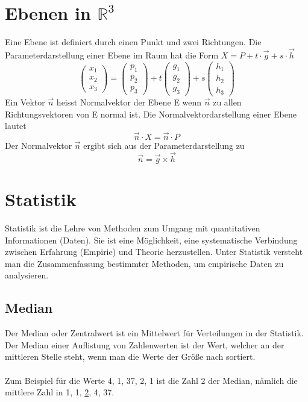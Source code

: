 \documentclass[a4paper]{article}
\begin{document}
\section{Ebenen in $\mathbb{R}^3$}
Eine Ebene ist definiert durch einen Punkt und zwei Richtungen.
Die Parameterdarstellung einer Ebene im Raum hat die Form $X=P+t\cdot \vec g + s \cdot \vec h$
\[\begin{pmatrix} x_1 \\ x_2\\ x_3 \end{pmatrix}=\begin{pmatrix} p_1 \\ p_2\\ p_3 \end{pmatrix} + t\begin{pmatrix} g_1 \\ g_2\\ g_3\end{pmatrix} + s\begin{pmatrix} h_1 \\ h_2\\ h_3\end{pmatrix} \]
Ein Vektor $\vec n$ heisst Normalvektor der Ebene E wenn $\vec n$ zu allen Richtungsvektoren von E normal ist. Die Normalvektordarstellung einer Ebene lautet
\[ \vec n \cdot X = \vec n \cdot P \]
Der Normalvektor $\vec n$ ergibt sich aus der Parameterdarstellung zu
\[ \vec n = \vec g \times \vec h \]

\section{Statistik}
Statistik ist die Lehre von Methoden zum Umgang mit quantitativen Informationen (Daten). Sie ist eine Möglichkeit, eine systematische Verbindung zwischen Erfahrung (Empirie) und Theorie herzustellen. Unter Statistik versteht man die Zusammenfassung bestimmter Methoden, um empirische Daten zu analysieren.
\subsection{Median}
Der Median oder Zentralwert ist ein Mittelwert für Verteilungen in der Statistik. Der Median einer Auflistung von Zahlenwerten ist der Wert, welcher an der mittleren Stelle steht, wenn man die Werte der Größe nach sortiert. \\\\ Zum Beispiel für die Werte 4, 1, 37, 2, 1 ist die Zahl 2 der Median, nämlich die mittlere Zahl in 1, 1, \underline{2}, 4, 37.
\end{document}
